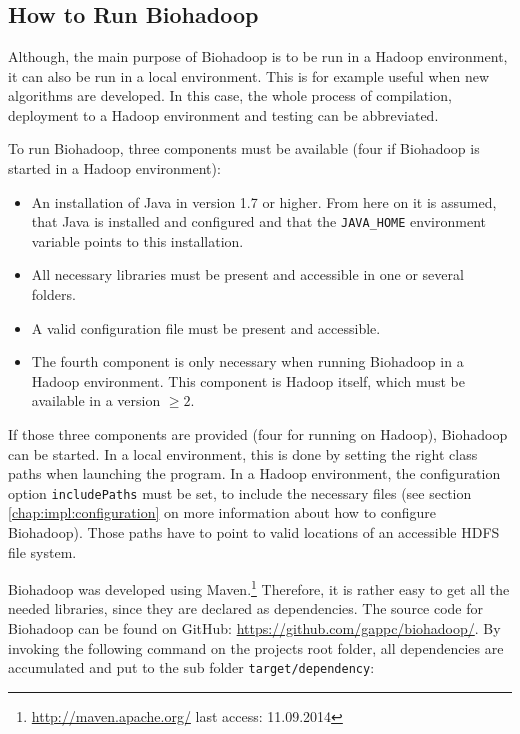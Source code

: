 \appendix
\addappheadtotoc

\chapter{}

\section{How to Run Biohadoop}
\label{chap:usage:run}
Although, the main purpose of Biohadoop is to be run in a Hadoop environment, it can also be run in a local environment. This is for example useful when new algorithms are developed. In this case, the whole process of compilation, deployment to a Hadoop environment and testing can be abbreviated.

To run Biohadoop, three components must be available (four if Biohadoop is started in a Hadoop environment):

\begin{itemize}
  \item An installation of Java in version 1.7 or higher. From here on it is assumed, that Java is installed and configured and that the \texttt{JAVA\_HOME} environment variable points to this installation.
  \item All necessary libraries must be present and accessible in one or several folders.
  \item A valid configuration file must be present and accessible.
  \item The fourth component is only necessary when running Biohadoop in a Hadoop environment. This component is Hadoop itself, which must be available in a version $\geq 2$.
\end{itemize}

If those three components are provided (four for running on Hadoop), Biohadoop can be started. In a local environment, this is done by setting the right class paths when launching the program. In a Hadoop environment, the configuration option \texttt{includePaths} must be set, to include the necessary files (see section \ref{chap:impl:configuration} on more information about how to configure Biohadoop). Those paths have to point to valid locations of an accessible HDFS file system.

Biohadoop was developed using Maven.\footnote{\url{http://maven.apache.org/} last access: 11.09.2014} Therefore, it is rather easy to get all the needed libraries, since they are declared as dependencies. The source code for Biohadoop can be found on GitHub: \url{https://github.com/gappc/biohadoop/}. By invoking the following command on the projects root folder, all dependencies are accumulated and put to the sub folder \texttt{target/dependency}:

